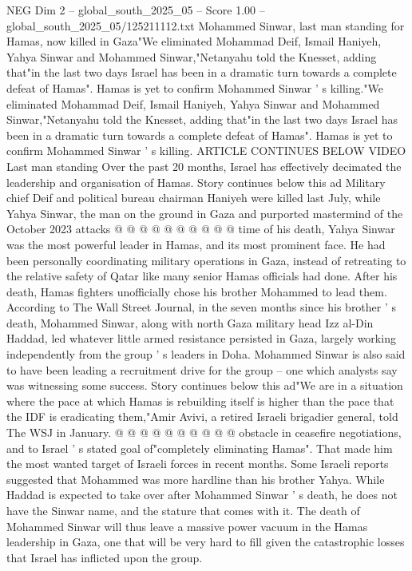 \begin{textsample}{NEG Dim 2 – global\_south\_2025\_05 – Score 1.00 – global\_south\_2025\_05/125211112.txt}  \label{ex:f2_neg_402}
Mohammed Sinwar, last man standing for Hamas, now killed in Gaza"We eliminated Mohammad Deif, Ismail Haniyeh, Yahya Sinwar and Mohammed Sinwar,"Netanyahu told the Knesset, adding that"in the last two days Israel has been in a dramatic turn towards a complete defeat of Hamas".
Hamas is yet to confirm Mohammed Sinwar ' s killing."We eliminated Mohammad Deif, Ismail Haniyeh, Yahya Sinwar and Mohammed Sinwar,"Netanyahu told the Knesset, adding that"in the last two days Israel has been in a dramatic turn towards a complete defeat of Hamas".
Hamas is yet to confirm Mohammed Sinwar ' s killing.
ARTICLE CONTINUES BELOW VIDEO Last man standing Over the past 20 months, Israel has effectively decimated the leadership and organisation of Hamas.
Story continues below this ad Military chief Deif and political bureau chairman Haniyeh were killed last July, while Yahya Sinwar, the man on the ground in Gaza and purported mastermind of the October 2023 attacks @ @ @ @ @ @ @ @ @ @ time of his death, Yahya Sinwar was the most powerful leader in Hamas, and its most prominent face.
He had been personally coordinating military operations in Gaza, instead of retreating to the relative safety of Qatar like many senior Hamas officials had done.
After his death, Hamas fighters unofficially chose his brother Mohammed to lead them.
According to The Wall Street Journal, in the seven months since his brother ' s death, Mohammed Sinwar, along with north Gaza military head Izz al-Din Haddad, led whatever little armed resistance persisted in Gaza, largely working independently from the group ' s leaders in Doha.
Mohammed Sinwar is also said to have been leading a recruitment drive for the group -- one which analysts say was witnessing some success.
Story continues below this ad"We are in a situation where the pace at which Hamas is rebuilding itself is higher than the pace that the IDF is eradicating them,"Amir Avivi, a retired Israeli brigadier general, told The WSJ in January. @ @ @ @ @ @ @ @ @ @ obstacle in ceasefire negotiations, and to Israel ' s stated goal of"completely eliminating Hamas".
That made him the most wanted target of Israeli forces in recent months.
Some Israeli reports suggested that Mohammed was more hardline than his brother Yahya.
While Haddad is expected to take over after Mohammed Sinwar ' s death, he does not have the Sinwar name, and the stature that comes with it.
The death of Mohammed Sinwar will thus leave a massive power vacuum in the Hamas leadership in Gaza, one that will be very hard to fill given the catastrophic losses that Israel has inflicted upon the group.

\end{textsample}

